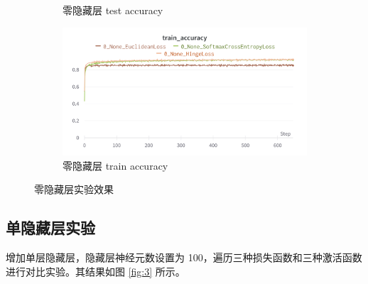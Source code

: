 \documentclass{article}
\begin{document}
\begin{figure}[htbp]
\begin{subfigure}{0.475\textwidth}
		\caption{零隐藏层 test accuracy}
	\end{subfigure}
	\begin{subfigure}{0.475\textwidth}
		\centering
		\includegraphics[width=1\textwidth]{../pics/零层实验-train_acc.png}
		\caption{零隐藏层 train accuracy}
	\end{subfigure}
	\caption{零隐藏层实验效果}
	\label{fig:2}
\end{figure}

\subsection{单隐藏层实验}
增加单层隐藏层，隐藏层神经元数设置为 100，遍历三种损失函数和三种激活函数进行对比实验。其结果如图 \ref{fig:3} 所示。
\end{document}
